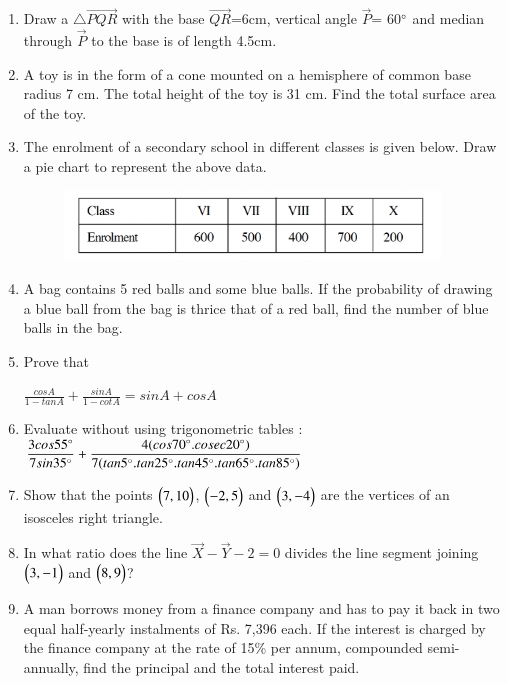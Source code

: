 \documentclass[journal,12pt,twocolumn]{IEEEtran}
\begin{document}
\begin{enumerate}
 \medskip 
 \item Draw a $\triangle\vec{PQR}$ with the base $\vec{QR}$=6cm, vertical angle $\vec{P}$= 60$\degree$ and median through $\vec{P}$ to the base is of length 4.5cm.
 \medskip
 \item A toy is in the form of a cone mounted on a hemisphere of common base radius 7 cm. The total height of the toy is 31 cm. Find the total surface area of the toy.
 \medskip
 \item The enrolment of a secondary school in different classes is given below. Draw a pie chart to represent the above data.
 \begin{figure}[h!]
    \centering
    \includegraphics[width=10cm]{7.png}
 \end{figure}
 \medskip
 \item A bag contains 5 red balls and some blue balls. If the probability of drawing a blue ball from the bag is thrice that of a red ball, find the number of blue balls in the bag.
 \medskip
 \item Prove that
 \begin{center}
 $\displaystyle\frac{cosA}{1-tanA}+\displaystyle\frac{sinA}{1-cotA}=sinA+cosA$
 \end{center}
 \medskip
 \item Evaluate without using trigonometric tables :\\
 \bigskip
 $\displaystyle\frac{3cos55\degree}{7sin35\degree}+\displaystyle\frac{4(cos70\degree.cosec20\degree)}{7(tan5\degree.tan25\degree.tan45\degree.tan65\degree.tan85\degree)}$
 \medskip
 \item Show that the points $\begin{pmatrix}7,10\end{pmatrix} $, $\begin{pmatrix}-2,5\end{pmatrix} $ and $\begin{pmatrix}3,-4\end{pmatrix} $ are the vertices of an isosceles right triangle.
 \medskip
 \item In what ratio does the line $\vec{X}-\vec{Y}-2=0$ divides the line segment joining  $\begin{pmatrix}3,-1\end{pmatrix} $ and  $\begin{pmatrix}8,9\end{pmatrix} $? 
 \medskip
 \item A man borrows money from a finance company and has to pay it back in two equal half-yearly instalments of Rs. 7,396 each. If the interest is charged by the finance company at the rate of 15\%  per annum, compounded semi-annually, find the principal and the total interest paid.
 \bigskip

\end{enumerate}
\end{document}
